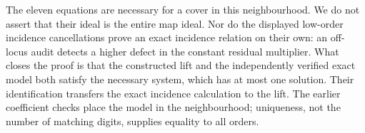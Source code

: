 \begin{remark}
The eleven equations are necessary for a cover in this neighbourhood.
We do not assert that their ideal is the entire map ideal.  Nor do
the displayed low-order incidence cancellations prove an exact
incidence relation on their own: an off-locus audit detects a higher
defect in the constant residual multiplier.
What closes the proof is that the constructed lift and the
independently verified exact model both satisfy the necessary system,
which has at most one solution.  Their identification transfers the
exact incidence calculation to the lift.  The earlier coefficient
checks place the model in the neighbourhood; uniqueness, not the
number of matching digits, supplies equality to all orders.
\end{remark}
